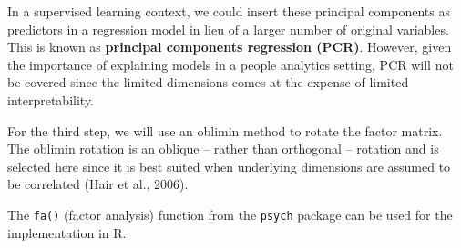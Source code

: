 \documentclass[
]{book}
\newenvironment{Shaded}{\begin{snugshade}}{\end{snugshade}}
\newcommand{\AttributeTok}[1]{\textcolor[rgb]{0.77,0.63,0.00}{#1}}
\newcommand{\CommentTok}[1]{\textcolor[rgb]{0.56,0.35,0.01}{\textit{#1}}}
\newcommand{\DecValTok}[1]{\textcolor[rgb]{0.00,0.00,0.81}{#1}}
\newcommand{\FunctionTok}[1]{\textcolor[rgb]{0.00,0.00,0.00}{#1}}
\newcommand{\NormalTok}[1]{#1}
\newcommand{\OtherTok}[1]{\textcolor[rgb]{0.56,0.35,0.01}{#1}}
\newcommand{\SpecialCharTok}[1]{\textcolor[rgb]{0.00,0.00,0.00}{#1}}
\newcommand{\StringTok}[1]{\textcolor[rgb]{0.31,0.60,0.02}{#1}}
\begin{document}
In a supervised learning context, we could insert these principal components as predictors in a regression model in lieu of a larger number of original variables. This is known as \textbf{principal components regression (PCR)}. However, given the importance of explaining models in a people analytics setting, PCR will not be covered since the limited dimensions comes at the expense of limited interpretability.

For the third step, we will use an oblimin method to rotate the factor matrix. The oblimin rotation is an oblique -- rather than orthogonal -- rotation and is selected here since it is best suited when underlying dimensions are assumed to be correlated (Hair et al., 2006).

The \texttt{fa()} (factor analysis) function from the \texttt{psych} package can be used for the implementation in R.

\begin{Shaded}
\end{Shaded}
\end{document}
